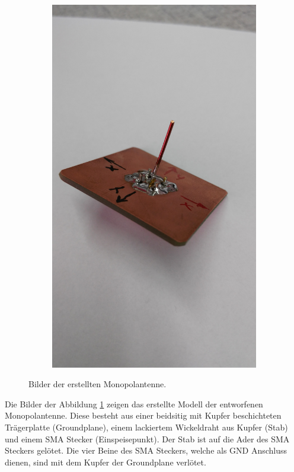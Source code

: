 \begin{figure}[h!]
\begin{subfigure}[b]{0.22\textwidth}
		\includegraphics[width=1\textwidth]{../fig/pic/monopol_model_4.jpg}
	\end{subfigure}
	\caption{Bilder der erstellten Monopolantenne.}
	\label{fig:monopol_model}
\end{figure}

Die Bilder der Abbildung \ref{fig:monopol_model} zeigen das erstellte Modell
der entworfenen Monopolantenne. Diese besteht aus einer beidsitig mit Kupfer
beschichteten Trägerplatte (Groundplane), einem lackiertem Wickeldraht
aus Kupfer (Stab) und einem SMA Stecker (Einspeisepunkt). Der Stab ist auf
die Ader des SMA Steckers gelötet. Die vier Beine des SMA Steckers, welche
als GND Anschluss dienen, sind mit dem Kupfer der Groundplane verlötet.

